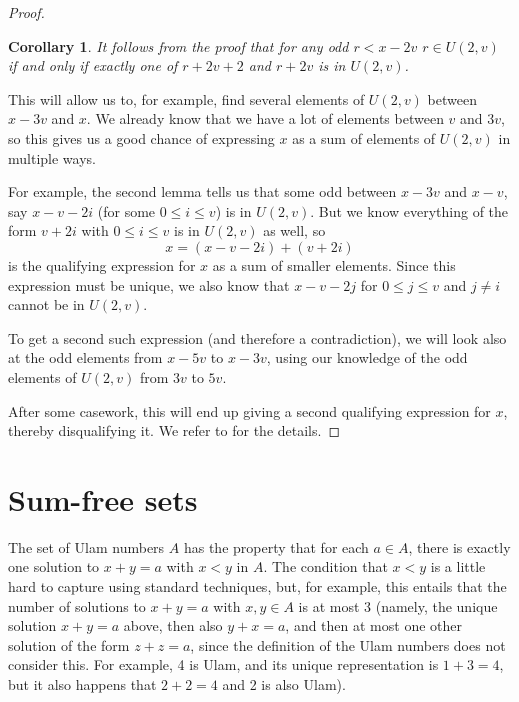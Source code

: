 \documentclass{report}
\newtheorem{corollary}{Corollary}[theorem]
\theoremstyle{remark}
\numberwithin{equation}{section}
\begin{document}
\begin{proof}
  \begin{corollary}
    It follows from the proof that for any odd $r < x-2v$
    $r \in U(2,v)$ if and only if exactly one of $r+2v+2$ and $r+2v$
    is in $U(2,v)$.
  \end{corollary}

  This will allow us to, for example, find several elements of
  $U(2,v)$ between $x-3v$ and $x$.  We already know that we have a lot
  of elements between $v$ and $3v$, so this gives us a good chance of
  expressing $x$ as a sum of elements of $U(2,v)$ in multiple ways.  

  For example, the second lemma tells us that some odd between $x-3v$
  and $x-v$, say $x-v-2i$ (for some $0 \leq i \leq v$) is in $U(2,v)$.
  But we know everything of the form $v+2i$ with $0 \leq i \leq v$ is
  in $U(2,v)$ as well, so \[x = (x-v-2i)+(v+2i)\] is the qualifying
  expression for $x$ as a sum of smaller elements.  Since this
  expression must be unique, we also know that $x-v-2j$ for
  $0 \leq j \leq v$ and $j \neq i$ cannot be in $U(2,v)$.

  To get a second such expression (and therefore a contradiction), we
  will look also at the odd elements from $x-5v$ to $x-3v$, using our
  knowledge of the odd elements of $U(2,v)$ from $3v$ to $5v$.  

  After some casework, this will end up giving a second qualifying
  expression for $x$, thereby disqualifying it.  We refer to
  \cite{schmerl:jct1994} for the details.
  

  \end{proof}

\section{Sum-free sets}

The set of Ulam numbers $A$ has the property that for each $a \in A$,
there is exactly one solution to $x+y=a$ with $x < y$ in $A$.  The
condition that $x < y$ is a little hard to capture using standard
techniques, but, for example, this entails that the number of
solutions to $x + y = a$ with $x, y \in A$ is at most 3 (namely, the
unique solution $x+y = a$ above, then also $y+x = a$, and then at most
one other solution of the form $z+z = a$, since the definition of the
Ulam numbers does not consider this.  For example, 4 is Ulam, and its
unique representation is $1+3=4$, but it also happens that $2+2=4$ and
2 is also Ulam).
\end{document}

